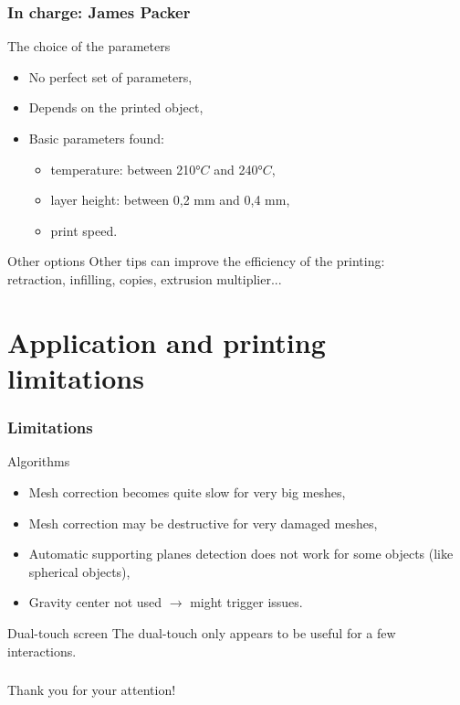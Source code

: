\documentclass{beamer}
\begin{document}
\begin{frame}
	\frametitle{In charge: James Packer}

	\begin{block}{The choice of the parameters}
	\begin{itemize}
	\item No perfect set of parameters,
	\item Depends on the printed object,
	\item Basic parameters found:
		\begin{itemize}
		\item temperature: between 210$°C$ and 240$°C$,
		\item layer height: between 0,2 mm  and 0,4 mm,
		\item print speed.
		\end{itemize}
	\end{itemize}	
    \end{block}
    
    \begin{block}{Other options}
    Other tips can improve the efficiency of the printing:	\\
    retraction, infilling, copies, extrusion multiplier...
    \end{block}
\end{frame}

\section{Application and printing limitations}
\begin{frame}
	\frametitle{Limitations}
	
	\begin{block}{Algorithms}
    \begin{itemize}
    \item Mesh correction becomes quite slow for very big meshes,
    \item Mesh correction may be destructive for very damaged meshes,
    \item Automatic supporting planes detection does not work for some objects (like spherical objects),
    \item Gravity center not used $\rightarrow$ might trigger issues.
    \end{itemize}
    \end{block}
    
    \begin{block}{Dual-touch screen}
    The dual-touch only appears to be useful for a few interactions.
    \end{block}
\end{frame}

\begin{frame}
	\frametitle{}

    \begin{center}
    \Large{Thank you for your attention!}
    \end{center}
\end{frame}
	
\end{document}
